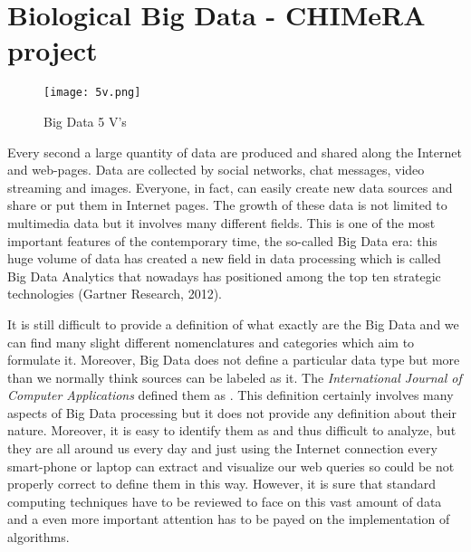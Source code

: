 \documentclass{standalone}
\begin{document}
\chapter[Big Data]{Biological Big Data - CHIMeRA project}\label{chapter3:bigdata}

\begin{center}
\begin{figure}[htbp]
\centering
\texttt{[image: 5v.png]}
\caption{Big Data 5 V's}
\label{fig:5v}
\end{figure}
\end{center}

Every second a large quantity of data are produced and shared along the Internet and web-pages.
Data are collected by social networks, chat messages, video streaming and images.
Everyone, in fact, can easily create new data sources and share or put them in Internet pages.
The growth of these data is not limited to multimedia data but it involves many different fields.
This is one of the most important features of the contemporary time, the so-called Big Data era: this huge volume of data has created a new field in data processing which is called Big Data Analytics that nowadays has positioned among the top ten strategic technologies (Gartner Research, 2012).

It is still difficult to provide a definition of what exactly are the Big Data and we can find many slight different nomenclatures and categories which aim to formulate it.
Moreover, Big Data does not define a particular data type but more than we normally think sources can be labeled as it.
The \emph{International Journal of Computer Applications} defined them as .
This definition certainly involves many aspects of Big Data processing but it does not provide any definition about their nature.
Moreover, it is easy to identify them as  and thus difficult to analyze, but they are all around us every day and just using the Internet connection every smart-phone or laptop can extract and visualize our web queries so could be not properly correct to define them in this way.
However, it is sure that standard computing techniques have to be reviewed to face on this vast amount of data and a even more important attention has to be payed on the implementation of algorithms.
\end{document}
